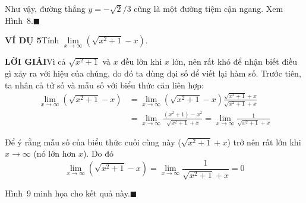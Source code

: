 \begin{minipage}[t]{0.71\textwidth}
    \noindent Như vậy, đường thẳng $y = -\sqrt{2}/3$ cũng là một đường tiệm cận ngang. Xem Hình~8.\hfill{\color{stewartcyan}$\blacksquare$}

    \vspace{1em}
    \noindent\textbf{\textsf{\color{stewartcyan}VÍ DỤ 5}}\hspace{1em}Tính $\lim\limits_{x \to \infty} \left(\sqrt{x^2 + 1} - x\right)$.

    \vspace{0.2em}
    \noindent\textbf{\textsf{\color{stewartcyan}LỜI GIẢI}}\hspace{1em}Vì cả $\sqrt{x^2 + 1}$ và $x$ đều lớn khi $x$ lớn, nên rất khó để nhận biết điều gì xảy ra với hiệu của chúng, do đó ta dùng đại số để viết lại hàm số. Trước tiên, ta nhân cả tử số và mẫu số với biểu thức căn liên hợp:
    \begin{align*}
    \lim_{x \to \infty} \left(\sqrt{x^2 + 1} - x\right)
    &= \lim_{x \to \infty} \left(\sqrt{x^2 + 1} - x\right) \frac{\sqrt{x^2 + 1} + x}{\sqrt{x^2 + 1} + x}\\[6pt]
    &= \lim_{x \to \infty} \frac{(x^2 + 1) - x^2}{\sqrt{x^2 + 1} + x}
    = \lim_{x \to \infty} \frac{1}{\sqrt{x^2 + 1} + x}
    \end{align*}

    \noindent Để ý rằng mẫu số của biểu thức cuối cùng này ($\sqrt{x^2 + 1} + x$) trở nên rất lớn khi $x \to \infty$ (nó lớn hơn $x$). Do đó
    \[
    \lim_{x \to \infty} \left(\sqrt{x^2 + 1} - x\right) = \lim_{x \to \infty} \frac{1}{\sqrt{x^2 + 1} + x} = 0
    \]

    \noindent Hình~9 minh họa cho kết quả này.\hfill{\color{stewartcyan}$\blacksquare$}
\end{minipage}
